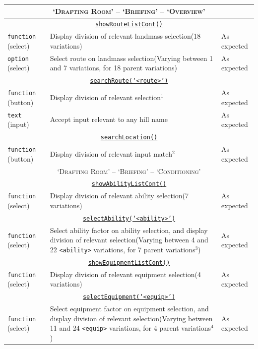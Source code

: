 \documentclass[11pt, english]{article}
\begin{document}
\begin{center}
\begin{longtable}{p{3cm}p{8cm}p{2cm}}
		\hline
		\multicolumn{3}{c}{\textsc{`Drafting Room' -- `Briefing' -- `Overview'}}\\
		\hline
		\multicolumn{3}{c}{\underline{\texttt{showRouteListCont()}}}\\
		\texttt{function} (select) & Display division of relevant landmass selection\newline (18 variations) & As expected\\
		\texttt{option} (select) & Select route on landmass selection\newline (Varying between 1 and 7 variations, for 18 parent variations) & As expected\\
		\multicolumn{3}{c}{\underline{\texttt{searchRoute(`<route>')}}}\\
		\texttt{function} (button) & Display division of relevant selection$^{1}$ & As expected\\
		\texttt{text} (input) & Accept input relevant to any hill name & As expected\\
		\multicolumn{3}{c}{\underline{\texttt{searchLocation()}}}\\
		\texttt{function} (button) & Display division of relevant input match$^{2}$ & As expected\\
		\hline
		\multicolumn{3}{c}{\textsc{`Drafting Room' -- `Briefing' -- `Conditioning'}}\\
		\hline
		\multicolumn{3}{c}{\underline{\texttt{showAbilityListCont()}}}\\
		\texttt{function} (select) & Display division of relevant ability selection\newline (7 variations) & As expected\\
		\multicolumn{3}{c}{\underline{\texttt{selectAbility(`<ability>')}}}\\
		\texttt{function} (select) & Select ability factor on ability selection, and display division of relevant selection\newline (Varying between 4 and 22 \texttt{<ability>} variations, for 7 parent variations$^{3}$) & As expected\\
		\multicolumn{3}{c}{\underline{\texttt{showEquipmentListCont()}}}\\
		\texttt{function} (select) & Display division of relevant equipment selection\newline (4 variations) & As expected\\
		\multicolumn{3}{c}{\underline{\texttt{selectEquipment(`<equip>')}}}\\
		\texttt{function} (select) & Select equipment factor on equipment selection, and display division of relevant selection\newline (Varying between 11 and 24 \texttt{<equip>} variations, for 4 parent variations$^{4}$) & As expected\\

\end{longtable}
\end{center}
\end{document}
